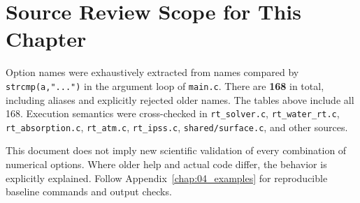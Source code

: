 \section{Source Review Scope for This Chapter}
\label{sec:auto:03_options:12}
Option names were exhaustively extracted from names compared by \texttt{strcmp(a,\allowbreak{}".\allowbreak{}.\allowbreak{}.\allowbreak{}")} in the argument loop of \texttt{main.\allowbreak{}c}. There are \textbf{168} in total, including aliases and explicitly rejected older names. The tables above include all 168. Execution semantics were cross-checked in \texttt{rt\_\allowbreak{}solver.\allowbreak{}c}, \texttt{rt\_\allowbreak{}water\_\allowbreak{}rt.\allowbreak{}c}, \texttt{rt\_\allowbreak{}absorption.\allowbreak{}c}, \texttt{rt\_\allowbreak{}atm.\allowbreak{}c}, \texttt{rt\_\allowbreak{}ipss.\allowbreak{}c}, \texttt{shared/\allowbreak{}surface.\allowbreak{}c}, and other sources.

This document does not imply new scientific validation of every combination of numerical options. Where older help and actual code differ, the behavior is explicitly explained. Follow Appendix~\ref{chap:04_examples} for reproducible baseline commands and output checks.

